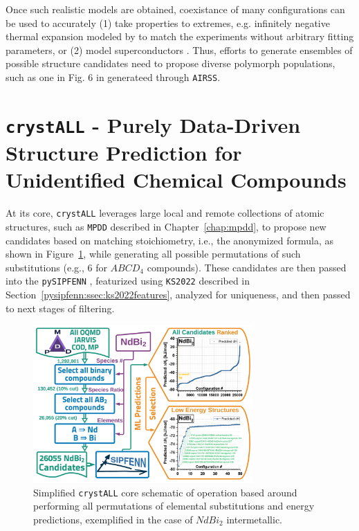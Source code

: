 Once such realistic models are obtained, coexistance of many configurations can be used to accurately (1) take properties to extremes, e.g. infinitely negative thermal expansion modeled by \citet{Liu2022} to match the experiments without arbitrary fitting parameters, or (2) model superconductors \cite{Ferreira2023}. Thus, efforts to generate ensembles of possible structure candidates need to propose diverse polymorph populations, such as one in Fig. 6 in \citet{Pickard2011} generateed through \texttt{AIRSS}.


\section{\texttt{crystALL} - Purely Data-Driven Structure Prediction for Unidentified Chemical Compounds} \label{crystall:sec:crystall}

At its core, \texttt{crystALL} leverages large local and remote collections of atomic structures, such as \texttt{MPDD} described in Chapter~\ref{chap:mpdd}, to propose new candidates based on matching stoichiometry, i.e., the anonymized formula, as shown in Figure~\ref{crystall:fig:crystallcompound}, while generating all possible permutations of such substitutions (e.g., 6 for $ABCD_4$ compounds). These candidates are then passed into the \texttt{pySIPFENN} \citet{Krajewski2024EfficientStructures}, featurized using \texttt{KS2022} described in Section~\ref{pysipfenn:ssec:ks2022features}, analyzed for uniqueness, and then passed to next stages of filtering.

\begin{figure}[H]
    \centering
    \includegraphics[width=0.75\textwidth]{crystall/NdBi2_GraphicalAbstract_V4.png}
    \caption{Simplified \texttt{crystALL} core schematic of operation based around performing all permutations of elemental substitutions and energy predictions, exemplified in the case of $NdBi_2$ intermetallic.}
    \label{crystall:fig:crystallcompound}
\end{figure}

